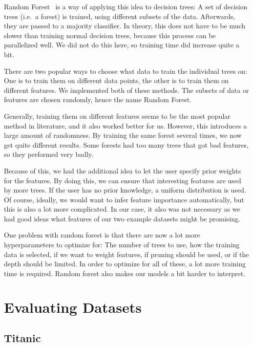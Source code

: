 \documentclass[a4paper]{article}
\begin{document}
Random Forest~\cite{friedman2001elements} is a way of applying this idea to decision trees: A set of decision trees (i.e.\ a forest) is trained, using different subsets of the data. Afterwards, they are passed to a majority classifier. In theory, this does not have to be much slower than training normal decision trees, because this process can be parallelized well. We did not do this here, so training time did increase quite a bit.

There are two popular ways to choose what data to train the individual trees on: One is to train them on different data points, the other is to train them on different features. We implemented both of these methods. The subsets of data or features are chosen randomly, hence the name Random Forest.

Generally, training them on different features seems to be the most popular method in literature, and it also worked better for us. However, this introduces a large amount of randomness. By training the same forest several times, we now get quite different results. Some forests had too many trees that got bad features, so they performed very badly.

Because of this, we had the additional idea to let the user specify prior weights for the features. By doing this, we can ensure that interesting features are used by more trees. If the user has no prior knowledge, a uniform distribution is used. Of course, ideally, we would want to infer feature importance automatically, but this is also a lot more complicated. In our case, it also was not necessary as we had good ideas what features of our two example datasets might be promising.

One problem with random forest is that there are now a lot more hyperparameters to optimize for: The number of trees to use, how the training data is selected, if we want to weight features, if pruning should be used, or if the depth should be limited. In order to optimize for all of these, a lot more training time is required. Random forest also makes our models a bit harder to interpret.

\section{Evaluating Datasets}

\subsection{Titanic}
\end{document}
